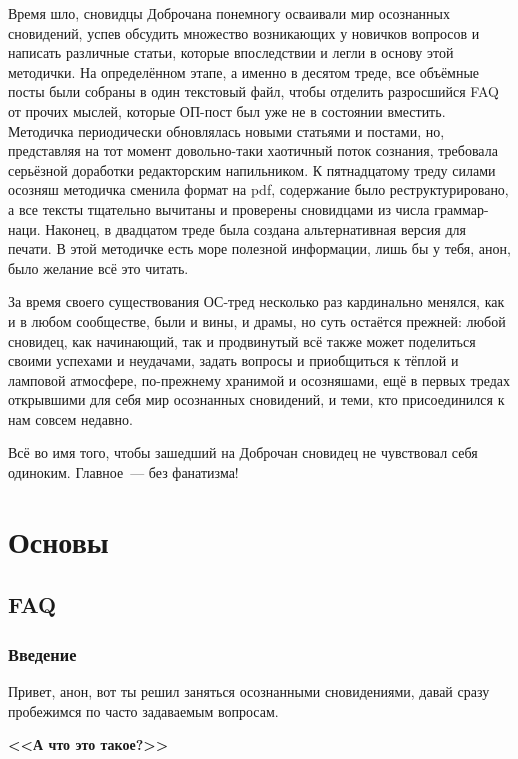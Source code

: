 \documentclass[a4paper,14pt,oneside]{memoir}
\begin{document}
Время шло, сновидцы Доброчана понемногу осваивали мир осознанных сновидений, успев обсудить множество возникающих у новичков вопросов и написать различные статьи, которые впоследствии и легли в основу этой методички. На определённом этапе, а именно в десятом треде,  все объёмные посты были собраны в один текстовый файл, чтобы отделить разросшийся FAQ от прочих мыслей, которые ОП-пост был уже не в состоянии вместить. Методичка периодически обновлялась новыми статьями и постами, но, представляя на тот момент довольно-таки хаотичный поток сознания, требовала серьёзной доработки редакторским напильником. К пятнадцатому треду силами осозняш методичка сменила формат на pdf, содержание было реструктурировано, а все тексты тщательно вычитаны и проверены сновидцами из числа граммар-наци. Наконец, в двадцатом треде была создана альтернативная версия для печати. В этой методичке есть море полезной информации, лишь бы у тебя, анон, было желание всё это читать.

\thispagestyle{empty}

За время своего существования ОС-тред несколько раз кардинально менялся, как и в любом сообществе,  были и вины, и драмы, но суть остаётся прежней: любой сновидец, как начинающий, так и продвинутый всё также может поделиться своими успехами и неудачами, задать вопросы и приобщиться к тёплой и ламповой атмосфере, по-прежнему хранимой и осозняшами, ещё в первых тредах открывшими для себя мир осознанных сновидений, и теми, кто присоединился к нам совсем недавно. 

\thispagestyle{empty}

Всё во имя того, чтобы зашедший на Доброчан сновидец не чувствовал себя одиноким. Главное~--- без фанатизма!


\clearpage
\tableofcontents


\part{Основы}

\chapter{FAQ}
\section{Введение}
Привет, анон, вот ты решил заняться осознанными сновидениями, давай сразу пробежимся по часто задаваемым вопросам.

\begin{center}
\textbf{<<А что это такое?>>}
\end{center}
\end{document}

